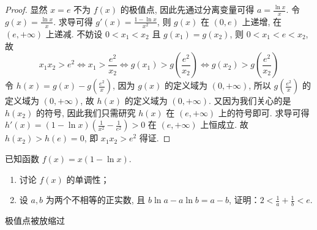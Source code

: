 \begin{proof}
    显然 $x = e$ 不为 $f(x)$ 的极值点, 因此先通过分离变量可得 $a = \frac{\ln x}{x}$. 令 $g(x) = \frac{\ln x}{x}$. 求导可得 $g'(x) = \frac{1 - \ln x}{x^2}$, 则 $g(x)$ 在 $(0, e)$ 上递增, 在 $(e, +\infty)$ 上递减. 不妨设 $0 < x_1 < x_2$ 且 $g(x_1) = g(x_2)$, 则 $0 < x_1 < e < x_2$, 故
\[
x_1 x_2 > e^2 \Leftrightarrow x_1 > \frac{e^2}{x_2} \Leftrightarrow g(x_1) > g\left(\frac{e^2}{x_2}\right) \Leftrightarrow g(x_2) > g\left(\frac{e^2}{x_2}\right)
\]
令 $h(x) = g(x) - g\left(\frac{e^2}{x}\right)$, 因为 $g(x)$ 的定义域为 $(0, +\infty)$, 所以 $g\left(\frac{e^2}{x}\right)$ 的定义域为 $(0, +\infty)$, 故 $h(x)$ 的定义域为 $(0, +\infty)$. 又因为我们关心的是 $h(x_2)$ 的符号, 因此我们只需研究 $h(x)$ 在 $(e, +\infty)$ 上的符号即可. 求导可得 $h'(x) = (1 - \ln x)\left(\frac{1}{x^2} - \frac{1}{e^2}\right) > 0$ 在 $(e, +\infty)$ 上恒成立. 故 $h(x_2) > h(e) = 0$, 即 $x_1 x_2 > e^2$ 得证. 
\end{proof}

\begin{example}[2021年新高考I卷]
    已知函数 $f(x) = x(1 - \ln x)$. 

\begin{enumerate}
    \item 讨论 $f(x)$ 的单调性；
    \item 设 $a, b$ 为两个不相等的正实数, 且 $b \ln a - a \ln b = a - b$, 证明：$2 < \frac{1}{a} + \frac{1}{b} < e$. 
\end{enumerate}

\end{example}
\begin{jie}
    
\end{jie}


极值点被放缩过


